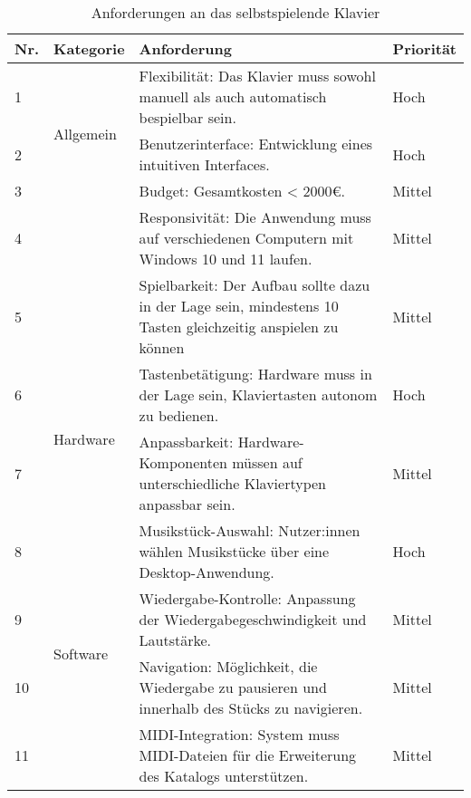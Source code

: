 \begin{table}[ht]
    \centering
    \begin{tabular}{ | m{1cm} | m{2cm} | m{8cm} | m{2cm} | }
        \hline
        \textbf{Nr.} & \textbf{Kategorie} & \textbf{Anforderung} & \textbf{Priorität} \\
        \hline
        1 & \multirow{3}{2cm}{Allgemein} & Flexibilität: Das Klavier muss sowohl manuell als auch automatisch bespielbar sein. & Hoch \\
        \cline{1-1} \cline{3-4}
        2 & & Benutzerinterface: Entwicklung eines intuitiven Interfaces. & Hoch \\
        \cline{1-1} \cline{3-4}
        3 & & Budget: Gesamtkosten < 2000€. & Mittel \\
        \cline{1-1} \cline{3-4}
        4 & & Responsivität: Die Anwendung muss auf verschiedenen Computern mit Windows 10 und 11 laufen. & Mittel \\
        \cline{1-1} \cline{3-4}
        5 & & Spielbarkeit: Der Aufbau sollte dazu in der Lage sein, mindestens 10 Tasten gleichzeitig anspielen zu können & Mittel \\
        \hline
        6 & \multirow{2}{2cm}{Hardware} & Tastenbetätigung: Hardware muss in der Lage sein, Klaviertasten autonom zu bedienen. & Hoch \\
        \cline{1-1} \cline{3-4}
        7 & & Anpassbarkeit: Hardware-Komponenten müssen auf unterschiedliche Klaviertypen anpassbar sein. & Mittel \\
        \hline
        8 & \multirow{4}{2cm}{Software} & Musikstück-Auswahl: Nutzer:innen wählen Musikstücke über eine Desktop-Anwendung. & Hoch \\
        \cline{1-1} \cline{3-4}
        9 & & Wiedergabe-Kontrolle: Anpassung der Wiedergabegeschwindigkeit und Lautstärke. & Mittel \\
        \cline{1-1} \cline{3-4}
        10 & & Navigation: Möglichkeit, die Wiedergabe zu pausieren und innerhalb des Stücks zu navigieren. & Mittel \\
        \cline{1-1} \cline{3-4}
        11 & & MIDI-Integration: System muss MIDI-Dateien für die Erweiterung des Katalogs unterstützen. & Mittel \\
        \hline
    \end{tabular}
    \caption{Anforderungen an das selbstspielende Klavier}
    \label{table:anforderungen}
\end{table}



